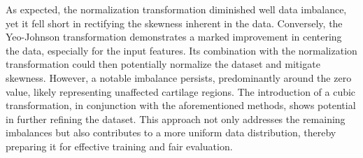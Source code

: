 As expected, the normalization transformation diminished well data imbalance, yet it fell short in rectifying the skewness inherent in the data. Conversely, the Yeo-Johnson transformation demonstrates a marked improvement in centering the data, especially for the input features. Its combination with the normalization transformation could then potentially normalize the dataset and mitigate skewness. However, a notable imbalance persists, predominantly around the zero value, likely representing unaffected cartilage regions. The introduction of a cubic transformation, in conjunction with the aforementioned methods, shows potential in further refining the dataset. This approach not only addresses the remaining imbalances but also contributes to a more uniform data distribution, thereby preparing it for effective training and fair evaluation.

